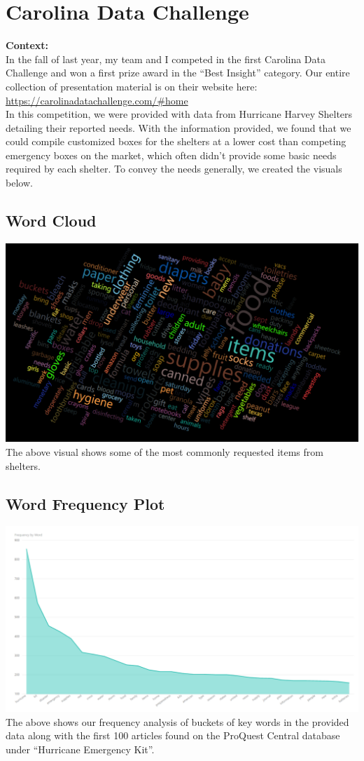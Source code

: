 \documentclass[]{article}
\begin{document}
\section{Carolina Data Challenge}\label{carolina-data-challenge}

\textbf{Context:}\\
In the fall of last year, my team and I competed in the first Carolina
Data Challenge and won a first prize award in the ``Best Insight''
category. Our entire collection of presentation material is on their
website here: \url{https://carolinadatachallenge.com/\#home}\\
In this competition, we were provided with data from Hurricane Harvey
Shelters detailing their reported needs. With the information provided,
we found that we could compile customized boxes for the shelters at a
lower cost than competing emergency boxes on the market, which often
didn't provide some basic needs required by each shelter. To convey the
needs generally, we created the visuals below.

\subsection{Word Cloud}\label{word-cloud}

\includegraphics[width=1\linewidth]{images/wordcloud} The above visual
shows some of the most commonly requested items from shelters.

\subsection{Word Frequency Plot}\label{word-frequency-plot}

\includegraphics[width=1\linewidth]{images/wordfreq} The above shows our
frequency analysis of buckets of key words in the provided data along
with the first 100 articles found on the ProQuest Central database under
``Hurricane Emergency Kit''.
\end{document}

